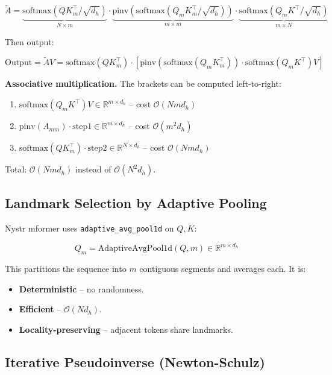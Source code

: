 \[
\tilde{A} = \underbrace{\mathrm{softmax}(Q K_m^\top / \sqrt{d_h})}_{N \times m} \cdot \underbrace{\mathrm{pinv}(\mathrm{softmax}(Q_m K_m^\top / \sqrt{d_h}))}_{m \times m} \cdot \underbrace{\mathrm{softmax}(Q_m K^\top / \sqrt{d_h})}_{m \times N}
\tag{3.3}
\]

Then output:

\[
\text{Output} = \tilde{A} V = \mathrm{softmax}(Q K_m^\top) \cdot \left[ \mathrm{pinv}(\mathrm{softmax}(Q_m K_m^\top)) \cdot \mathrm{softmax}(Q_m K^\top) V \right]
\tag{3.4}
\]

\textbf{Associative multiplication.} The brackets can be computed left-to-right:

\begin{enumerate}
\item $\mathrm{softmax}(Q_m K^\top) V \in \mathbb{R}^{m \times d_h}$ -- cost $\mathcal{O}(N m d_h)$
\item $\mathrm{pinv}(A_{mm}) \cdot \text{step1} \in \mathbb{R}^{m \times d_h}$ -- cost $\mathcal{O}(m^2 d_h)$
\item $\mathrm{softmax}(Q K_m^\top) \cdot \text{step2} \in \mathbb{R}^{N \times d_h}$ -- cost $\mathcal{O}(N m d_h)$

\end{enumerate}
Total: $\mathcal{O}(N m d_h)$ instead of $\mathcal{O}(N^2 d_h)$.

\subsection{Landmark Selection by Adaptive Pooling}

Nystr mformer uses \texttt{adaptive\_avg\_pool1d} on $Q, K$:

\[
Q_m = \mathrm{AdaptiveAvgPool1d}(Q, m) \in \mathbb{R}^{m \times d_h}
\tag{3.5}
\]

This partitions the sequence into $m$ contiguous segments and averages 
each. It is:

\begin{itemize}
\item \textbf{Deterministic} -- no randomness.
\item \textbf{Efficient} -- $\mathcal{O}(N d_h)$.
\item \textbf{Locality-preserving} -- adjacent tokens share landmarks.

\end{itemize}
\subsection{Iterative Pseudoinverse (Newton-Schulz)}

